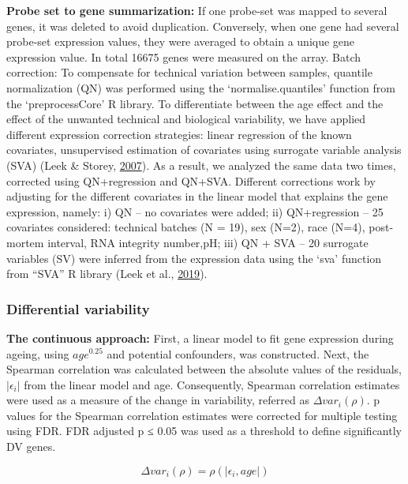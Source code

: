 \documentclass[12pt,twoside]{unicam}
\begin{document}
\textbf{Probe set to gene summarization:} If one probe-set was mapped to several genes, it was deleted to avoid duplication. Conversely, when one gene had several probe-set expression values, they were averaged to obtain a unique gene expression value. In total 16675 genes were measured on the array.
Batch correction: To compensate for technical variation between samples, quantile normalization (QN) was performed using the `normalise.quantiles' function from the `preprocessCore' R library. To differentiate between the age effect and the effect of the unwanted technical and biological variability, we have applied different expression correction strategies: linear regression of the known covariates, unsupervised estimation of covariates using surrogate variable analysis (SVA) (Leek \& Storey, \protect\hyperlink{ref-Leek2007}{2007}). As a result, we analyzed the same data two times, corrected using QN+regression and QN+SVA. Different corrections work by adjusting for the different covariates in the linear model that explains the gene expression, namely: i) QN -- no covariates were added; ii) QN+regression -- 25 covariates considered: technical batches (N = 19), sex (N=2), race (N=4), post-mortem interval, RNA integrity number,pH; iii) QN + SVA -- 20 surrogate variables (SV) were inferred from the expression data using the `sva' function from ``SVA'' R library (Leek et al., \protect\hyperlink{ref-svapack}{2019}).

\hypertarget{differential-variability}{%
\subsubsection{Differential variability}\label{differential-variability}}

\textbf{The continuous approach:} First, a linear model to fit gene expression during ageing, using \(age^{0.25}\) and potential confounders, was constructed. Next, the Spearman correlation was calculated between the absolute values of the residuals, \(|\epsilon_i|\) from the linear model and age. Consequently, Spearman correlation estimates were used as a measure of the change in variability, referred as \(\Delta var_i(\rho)\). p values for the Spearman correlation estimates were corrected for multiple testing using FDR. FDR adjusted p ≤ 0.05 was used as a threshold to define significantly DV genes.

\[\Delta var_i(\rho)=\rho(|\epsilon_i,age|)\]
\end{document}
